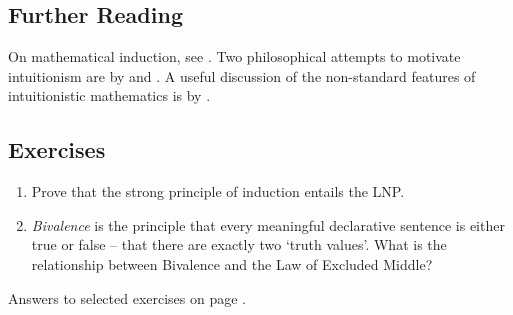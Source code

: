 {\small
\subsection*{Further Reading}

On mathematical induction, see  \citet{macsetthl}. Two philosophical attempts to motivate intuitionism are by \citet{heyintin} and \citet{dumphibai}. A useful discussion of the non-standard features of intuitionistic mathematics is by \citet{int}. 



\subsection*{Exercises} \label{ex:induct}

\begin{enumerate}
\item Prove that the strong principle of induction entails the LNP.

\item \emph{Bivalence} is the principle that every meaningful declarative sentence is either true or false – that there are exactly two `truth values'. What is the relationship between Bivalence and the Law of Excluded Middle? 


\end{enumerate}

Answers to selected exercises on page \pageref{ans:induct}.
}








